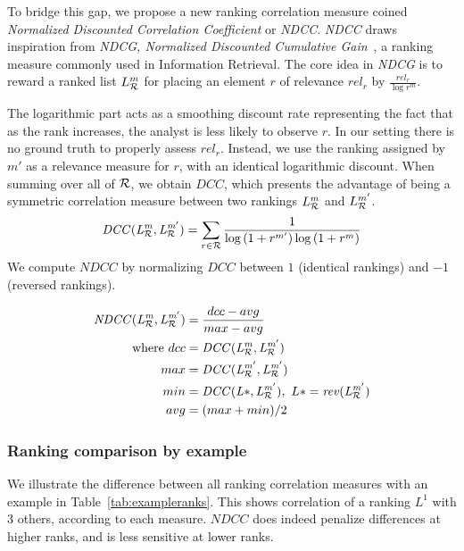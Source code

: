 To bridge this gap, we propose a new ranking correlation measure coined
\emph{Normalized Discounted Correlation Coefficient} or {\em NDCC}.
{\em NDCC} draws inspiration from {\em NDCG, Normalized Discounted Cumulative Gain}~\cite{JarvelinACM02},
a ranking measure commonly used in Information Retrieval.
The core idea in {\em NDCG} is to reward a ranked list $L_{\mathcal{R}}^m$ for placing an element $r$
of relevance $\mathit{rel_r}$ by $\frac{\mathit{rel_r}}{\log{r^m}}$.

The logarithmic part acts as a smoothing discount rate representing the fact that as the rank increases,
the analyst is less likely to observe $r$.
In our setting there is no ground truth to properly assess $\mathit{rel_r}$.
Instead, we use the ranking assigned by $m'$ as a relevance measure for $r$,
with an identical logarithmic discount.
When summing over all of $\mathcal{R}$, we obtain $\mathit{DCC}$,
which presents the advantage of being a symmetric correlation measure between two rankings $L_{\mathcal{R}}^m$ and $L_{\mathcal{R}}^{m'}$.
$$\mathit{DCC(L_{\mathcal{R}}^m,L_{\mathcal{R}}^{m'})}=\sum_{r\in \mathcal{R}}{\frac{1}{\log{(1+r^{m'})}\log{(1+r^m)}}}$$
We compute $\mathit{NDCC}$ by normalizing $\mathit{DCC}$ between
$1$ (identical rankings) and $-1$ (reversed rankings).

\begin{equation*}
\begin{split}
    \mathit{NDCC(L_{\mathcal{R}}^m,L_{\mathcal{R}}^{m'})}&=\frac{dcc-avg}{max-avg}\\
\mbox{where } dcc&=\mathit{DCC(L_{\mathcal{R}}^m,L_{\mathcal{R}}^{m'})}\\
    max&=\mathit{DCC(L_{\mathcal{R}}^{m'},L_{\mathcal{R}}^{m'})}\\
    min&=\mathit{DCC(L*,L_{\mathcal{R}}^{m'})},\ L*=\mathit{rev(L_{\mathcal{R}}^{m'})}\\
    avg&=(max+min)/2
\end{split}
\end{equation*}



\pagebreak



\subsubsection{Ranking comparison by example}

We illustrate the difference between all ranking correlation measures with an example in Table~\ref{tab:exampleranks}.
This shows correlation of a ranking $L^1$ with 3 others, according to each measure.
$\mathit{NDCC}$ does indeed penalize differences at higher ranks, and is less sensitive at lower ranks.

